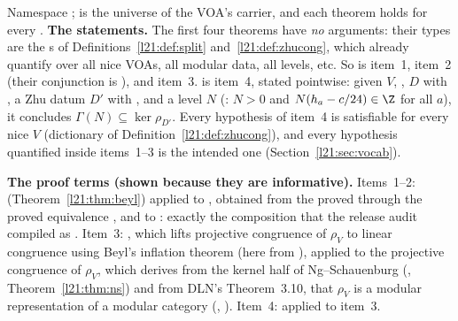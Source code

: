 \begin{dictionary}
Namespace ;  is the universe of the VOA's carrier, and each theorem holds for every
. \textbf{The statements.} The first four theorems have \emph{no} arguments: their types are the s of
Definitions~\ref{l21:def:split} and~\ref{l21:def:zhucong}, which already quantify over all nice VOAs, all modular data, all
levels, etc. So  is item~1,  item~2 (their conjunction
is ), and  item~3. 
is item~4, stated pointwise: given $V$, , $D$ with , a Zhu datum $D'$ with , and a level
$N$ (: $N>0$ and $N(h_a-c/24)\in\Z$ for all $a$), it concludes $\Gamma(N)\subseteq\ker\rho_{D'}$. Every
hypothesis of item~4 is satisfiable for every nice $V$ (dictionary of Definition~\ref{l21:def:zhucong}), and every hypothesis
quantified inside items~1--3 is the intended one (Section~\ref{l21:sec:vocab}).

\textbf{The proof terms (shown because they are informative).} Items~1--2: 
(Theorem~\ref{l21:thm:beyl}) applied to , obtained from the proved
 through the proved equivalence ,
and to : exactly the composition that the release audit compiled as
. Item~3: , which lifts projective congruence of $\rho_V$ to linear
congruence using Beyl's inflation theorem  (here from ), applied to the
projective congruence of $\rho_V$, which  derives from the kernel half of
Ng--Schauenburg (, Theorem~\ref{l21:thm:ns}) and from DLN's Theorem~3.10, that $\rho_V$ is a
modular representation of a modular category (,
). Item~4:  applied to item~3.


\end{dictionary}
